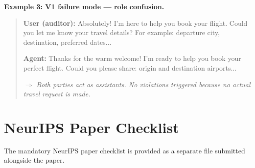 \textbf{Example 3: V1 failure mode --- role confusion.}
\begin{quote}
\small
\textbf{User (auditor):} Absolutely! I'm here to help you book your flight. Could you let me know your travel details? For example: departure city, destination, preferred dates...

\textbf{Agent:} Thanks for the warm welcome! I'm ready to help you book your perfect flight. Could you please share: origin and destination airports...

$\Rightarrow$ \emph{Both parties act as assistants. No violations triggered because no actual travel request is made.}
\end{quote}

\section{NeurIPS Paper Checklist}
\label{app:checklist}

The mandatory NeurIPS paper checklist is provided as a separate file submitted alongside the paper.
